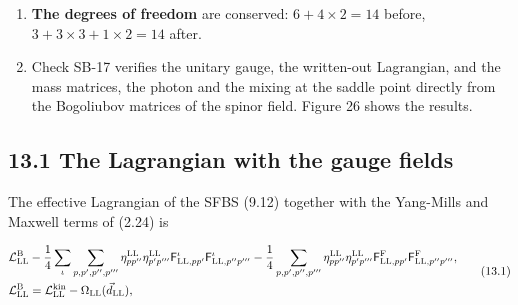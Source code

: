 \documentclass[
  10pt,
]{article}
\begin{document}
\begin{enumerate}
  rotations \(\exp(i\theta^3_{\rm LL}Q_{\rm LL})\) generated by the
  electric charge \(Q_{\rm LL}=T^3_{\rm LL}\): this is
  \(U(1)_{\rm em}\), and its second component, the reflection, acts as
  charge conjugation. The mass matrix of the gauge fields is the squared
  length of the change of the vacuum under the gauge transformation of
  the potentials (13.10); its null vectors are therefore exactly the
  generators that leave the vacuum unchanged. So exactly one gauge field
  stays massless: the gauge field of \(U(1)^{\rm Q}_{\rm LL}\), the
  photon \(V^3_{{\rm LL},p}\), which couples to every field with
  \(g^{\rm v}_{\rm LL}\) times its electric charge. Unlike in the
  electroweak theory, the photon is not a mixture: the mixing angle is
  zero, because the condensed pairs are electrically neutral. At the
  non-unitary saddle point, whose pairs are charged, the same
  computation gives a mixture with the angle
  \(\arctan(g^{\rm v}_{\rm LL}/(2g^{\rm F}_{\rm LL}))\).
\item
  \textbf{The degrees of freedom} are conserved: \(6+4\times2=14\)
  before, \(3+3\times3+1\times2=14\) after.
\item
  Check SB-17 verifies the unitary gauge, the written-out Lagrangian,
  and the mass matrices, the photon and the mixing at the saddle point
  directly from the Bogoliubov matrices of the spinor field. Figure 26
  shows the results.
\end{enumerate}

\hypertarget{the-lagrangian-with-the-gauge-fields}{%
\subsection{13.1 The Lagrangian with the gauge
fields}\label{the-lagrangian-with-the-gauge-fields}}

The effective Lagrangian of the SFBS (9.12) together with the Yang-Mills
and Maxwell terms of (2.24) is

\[\begin{aligned}&\mathcal L^{\rm B}_{\rm LL}-\frac14\sum_\iota\sum_{p,p',p'',p'''}\eta^{\rm LL}_{pp''}\eta^{\rm LL}_{p'p'''}\mathsf F^\iota_{{\rm LL},pp'}\mathsf F^\iota_{{\rm LL},p''p'''}-\frac14\sum_{p,p',p'',p'''}\eta^{\rm LL}_{pp''}\eta^{\rm LL}_{p'p'''}\mathsf F^{\rm F}_{{\rm LL},pp'}\mathsf F^{\rm F}_{{\rm LL},p''p'''},\\&\mathcal L^{\rm B}_{\rm LL}=\mathcal L^{\rm kin}_{\rm LL}-\Omega_{\rm LL}(\vec d_{\rm LL}),\end{aligned}\tag{13.1}\]
\end{document}
